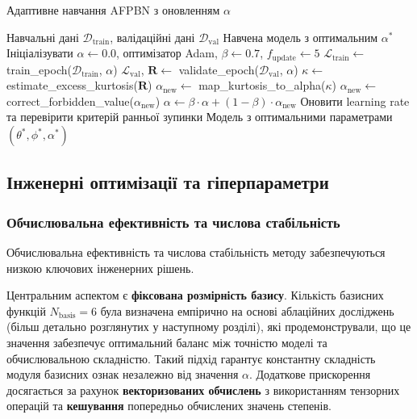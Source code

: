 \documentclass[12pt,a4paper]{article}
\begin{document}
\begin{algorithm}[htbp]
	\caption{Адаптивне навчання AFPBN з оновленням $\alpha$}
	\label{alg:adaptive_alpha_training}
	\begin{algorithmic}[1]
		\REQUIRE Навчальні дані $\mathcal{D}_{\text{train}}$, валідаційні дані $\mathcal{D}_{\text{val}}$
		\ENSURE Навчена модель з оптимальним $\alpha^*$
		\STATE Ініціалізувати $\alpha \leftarrow 0.0$, оптимізатор Adam, $\beta \leftarrow 0.7$, $f_{\text{update}} \leftarrow 5$
		\STATE $\mathcal{L}_{\text{train}} \leftarrow$ train\_epoch($\mathcal{D}_{\text{train}}$, $\alpha$)
		\STATE $\mathcal{L}_{\text{val}}$, $\mathbf{R} \leftarrow$ validate\_epoch($\mathcal{D}_{\text{val}}$, $\alpha$)
		\STATE $\kappa \leftarrow$ estimate\_excess\_kurtosis($\mathbf{R}$)
		\STATE $\alpha_{\text{new}} \leftarrow$ map\_kurtosis\_to\_alpha($\kappa$) 
		\STATE $\alpha_{\text{new}} \leftarrow$ correct\_forbidden\_value($\alpha_{\text{new}}$) 
		\STATE $\alpha \leftarrow \beta \cdot \alpha + (1-\beta) \cdot \alpha_{\text{new}}$ 
		\ENDIF
		\STATE Оновити learning rate та перевірити критерій ранньої зупинки
		\ENDFOR
		\RETURN Модель з оптимальними параметрами $(\theta^*, \phi^*, \alpha^*)$
	\end{algorithmic}
\end{algorithm}

\subsection{Інженерні оптимізації та гіперпараметри}
\label{sec:engineering_optimizations}

\subsubsection{Обчислювальна ефективність та числова стабільність}

Обчислювальна ефективність та числова стабільність методу забезпечуються низкою ключових інженерних рішень.

Центральним аспектом є \textbf{фіксована розмірність базису}. Кількість базисних функцій $N_{\text{basis}} = 6$ була визначена емпірично на основі аблаційних досліджень (більш детально розглянутих у наступному розділі), які продемонстрували, що це значення забезпечує оптимальний баланс між точністю моделі та обчислювальною складністю. Такий підхід гарантує константну складність модуля базисних ознак незалежно від значення $\alpha$. Додаткове прискорення досягається за рахунок \textbf{векторизованих обчислень} з використанням тензорних операцій та \textbf{кешування} попередньо обчислених значень степенів.
\end{document}
